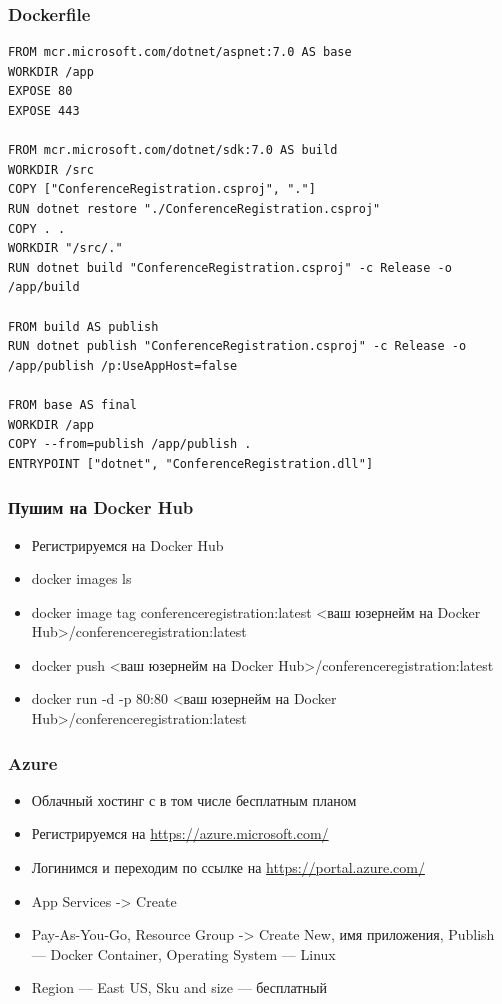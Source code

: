 \documentclass{../../slides-style}
\begin{document}
    \begin{frame}[fragile]
        \frametitle{Dockerfile}
        \begin{scriptsize}
            \begin{verbatim}
FROM mcr.microsoft.com/dotnet/aspnet:7.0 AS base
WORKDIR /app
EXPOSE 80
EXPOSE 443

FROM mcr.microsoft.com/dotnet/sdk:7.0 AS build
WORKDIR /src
COPY ["ConferenceRegistration.csproj", "."]
RUN dotnet restore "./ConferenceRegistration.csproj"
COPY . .
WORKDIR "/src/."
RUN dotnet build "ConferenceRegistration.csproj" -c Release -o /app/build

FROM build AS publish
RUN dotnet publish "ConferenceRegistration.csproj" -c Release -o /app/publish /p:UseAppHost=false

FROM base AS final
WORKDIR /app
COPY --from=publish /app/publish .
ENTRYPOINT ["dotnet", "ConferenceRegistration.dll"]
            \end{verbatim}
        \end{scriptsize}
    \end{frame}

    \begin{frame}[fragile]
        \frametitle{Пушим на Docker Hub}
        \begin{itemize}
            \item Регистрируемся на Docker Hub
            \item docker images ls
            \item docker image tag conferenceregistration:latest <ваш юзернейм на Docker Hub>/conferenceregistration:latest
            \item docker push <ваш юзернейм на Docker Hub>/conferenceregistration:latest
            \item docker run -d -p 80:80 <ваш юзернейм на Docker Hub>/conferenceregistration:latest
        \end{itemize}
    \end{frame}

    \begin{frame}
        \frametitle{Azure}
        \begin{itemize}
            \item Облачный хостинг с в том числе бесплатным планом
            \item Регистрируемся на \url{https://azure.microsoft.com/}
            \item Логинимся и переходим по ссылке на \url{https://portal.azure.com/}
            \item App Services -> Create
            \item Pay-As-You-Go, Resource Group -> Create New, имя приложения, Publish --- Docker Container, Operating System --- Linux
            \item Region --- East US, Sku and size --- бесплатный
        \end{itemize}
    \end{frame}
\end{document}
